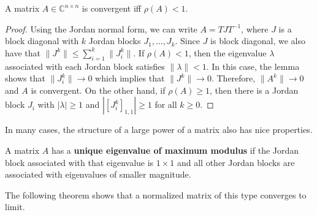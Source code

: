 \begin{theorem}
A matrix $A \in \mathbb{C}^{n\times n}$ is convergent iff $\rho(A)<1$.
\end{theorem}

\begin{proof}
Using the Jordan normal form, we can write $A = T J T^{-1}$, where $J$ is a block diagonal with $k$ Jordan blocks $J_1,\ldots,J_k$.
Since $J$ is block diagonal, we also have that $\| J^k \| \leq \sum_{i=1}^k \| J_i^k \|$.
If $\rho(A)<1$, then the eigenvalue $\lambda$ associated with each Jordan block satisfies $\| \lambda \| < 1$.
In this case, the lemma shows that $\| J_i^k \| \rightarrow 0$ which implies that $\| J^k \| \rightarrow 0$.
Therefore, $\| A^k \| \rightarrow 0$ and $A$ is convergent.
On the other hand, if $\rho(A) \geq 1$, then there is a Jordan block $J_i$ with $| \lambda | \geq 1$ and $| [ J_i^k ]_{1,1} | \geq 1$ for all $k\geq 0$.
\end{proof}

In many cases, the structure of a large power of a matrix also has nice properties.

\begin{definition}
A matrix $A$ has a \textbf{unique eigenvalue of maximum modulus} if the Jordan block associated with that eigenvalue is $1\times 1$ and all other Jordan blocks are associated with eigenvalues of smaller magnitude.
\end{definition}

The following theorem shows that a normalized matrix of this type converges to limit.


